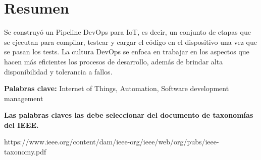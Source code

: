 \chapter*{Resumen}
Se construyó un Pipeline DevOps para IoT, es decir, un conjunto de etapas que se ejecutan para compilar, testear y cargar el código en el dispositivo una vez que se pasan los tests. 
La cultura DevOps se enfoca en trabajar en los aspectos que hacen más eficientes los procesos de desarrollo, además de brindar alta disponibilidad y tolerancia a fallos.

\vspace{.5cm}

\textbf{Palabras clave:} Internet of Things, Automation, Software development management

\vspace{.5cm}
\textbf{Las palabras claves las debe seleccionar del documento de taxonomías del IEEE.}

\vspace{.5cm}
https://www.ieee.org/content/dam/ieee-org/ieee/web/org/pubs/ieee-taxonomy.pdf

